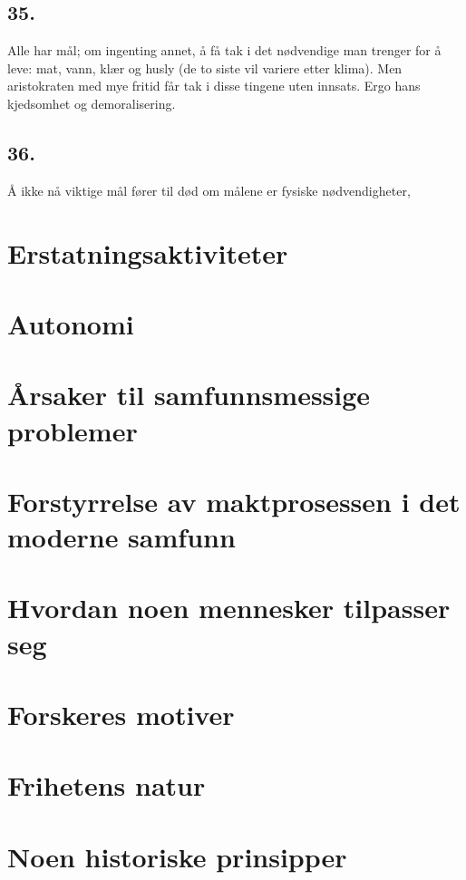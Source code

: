 \documentclass[oneside]{book}
\begin{document}
\section*{35.}
Alle har mål; om ingenting annet, å få tak i det nødvendige man trenger for å leve: mat, vann, klær og husly (de to siste vil variere etter klima). Men aristokraten med mye fritid får tak i disse tingene uten innsats. Ergo hans kjedsomhet og demoralisering.

\section*{36.}
Å ikke nå viktige mål fører til død om målene er fysiske nødvendigheter,

\chapter{Erstatningsaktiviteter}

\chapter{Autonomi}

\chapter{Årsaker til samfunnsmessige problemer}

\chapter{Forstyrrelse av maktprosessen i det moderne samfunn}

\chapter{Hvordan noen mennesker tilpasser seg}

\chapter{Forskeres motiver}

\chapter{Frihetens natur}

\chapter{Noen historiske prinsipper}
\end{document}
